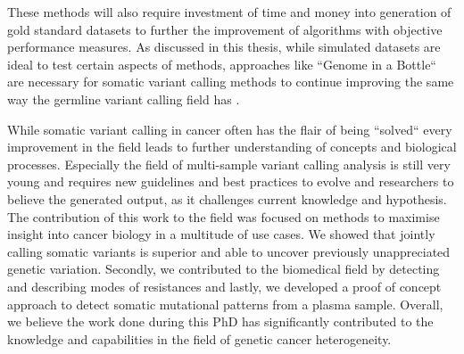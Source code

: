 These methods will also require investment of time and money into generation of gold standard datasets to further the improvement of algorithms with objective performance measures. As discussed in this thesis, while simulated datasets are ideal to test certain aspects of methods, approaches like ``Genome in a Bottle`` are necessary for somatic variant calling methods to continue improving the same way the germline variant calling field has \cite{ValleInclan2022}.

While somatic variant calling in cancer often has the flair of being ``solved`` every improvement in the field leads to further understanding of concepts and biological processes. Especially the field of multi-sample variant calling analysis is still very young and requires new guidelines and best practices to evolve and researchers to believe the generated output, as it challenges current knowledge and hypothesis. The contribution of this work to the field was focused on methods to maximise insight into cancer biology in a multitude of use cases. We showed that jointly calling somatic variants is superior and able to uncover previously unappreciated genetic variation. Secondly, we contributed to the biomedical field by detecting and describing modes of resistances and lastly, we developed a proof of concept approach to detect somatic mutational patterns from a plasma sample. Overall, we believe the work done during this PhD has significantly contributed to the knowledge and capabilities in the field of genetic cancer heterogeneity.

